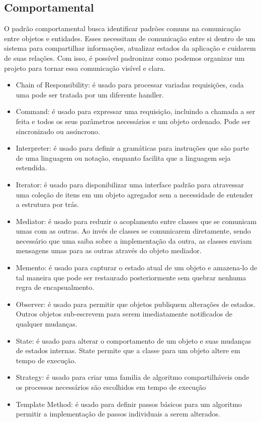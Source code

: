 \subsection{Comportamental}
O padrão comportamental busca identificar padrões comuns na comunicação entre objetos e entidades. Esses necessitam de comunicação entre si dentro de um sistema para compartilhar informações, atualizar estados da aplicação e cuidarem de suas relações. Com isso, é possível padronizar como podemos organizar um projeto para tornar essa comunicação visível e clara.

\begin{itemize}
	\item Chain of Responsibility: é usado para processar variadas requisições, cada uma pode ser tratada por um diferente handler.
	\item Command: é usado para expressar uma requisição, incluindo a chamada a ser feita e todos os seus parâmetros necessários e um objeto ordenado. Pode ser sincronizado ou assíncrono. 
	\item Interpreter: é usado para definir a gramáticas para instruções que são parte de uma linguagem ou notação, enquanto facilita que a linguagem seja estendida.
	\item Iterator: é usado para disponibilizar uma interface padrão para atravessar uma coleção de itens em um objeto agregador sem a necessidade de entender a estrutura por trás.
	\item Mediator: é usado para reduzir o acoplamento entre classes que se comunicam umas com as outras. Ao invés de classes se comunicarem diretamente, sendo necessário que uma saiba sobre a implementação da outra, as classes enviam mensagens umas para as outras através do objeto mediador.
	\item Memento: é usado para capturar o estado atual de um objeto e amazena-lo de tal maneira que pode ser restaurado posteriormente sem quebrar nenhuma regra de encapsualmento. 
	\item Observer: é usado para permitir que objetos publiquem alterações de estados. Outros objetos sub-escrevem para serem imediatamente notificados de qualquer mudanças.
	\item State: é usado para alterar o comportamento de um objeto e suas mudanças de estados internas. State permite que a classe para um objeto altere em tempo de execução.
	\item Strategy: é usado para criar uma familia de algoritmo compartilháveis onde os processos necessários são escolhidos em tempo de execução
	\item Template Method: é usado para definir passos básicos para um algoritmo permitir a implementação de passos individuais a serem alterados.
\end{itemize}